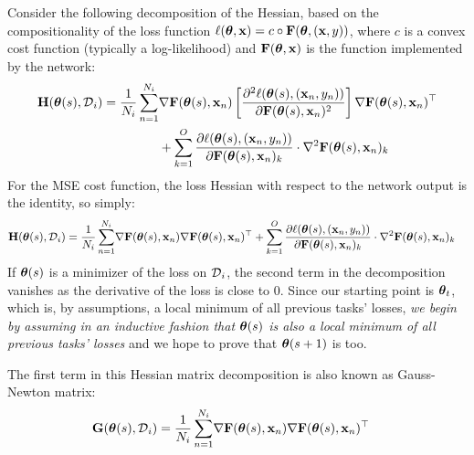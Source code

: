 \documentclass{article} %
\newcommand{\hessian}{\vH}
\begin{document}
Consider the following decomposition of the Hessian, based on the compositionality of the loss function $\ell(\mbox{$\mbox{$\boldsymbol{\theta}$}$}, \mbox{$\mbox{$\mathbf{x}$}$}) = c\circ\mbox{$\mbox{$\mathbf{F}$}$}(\mbox{$\mbox{$\boldsymbol{\theta}$}$},(\mbox{$\mbox{$\mathbf{x}$}$}, y))$, where $c$ is a convex cost function (typically a log-likelihood) and $\mbox{$\mbox{$\mathbf{F}$}$}(\mbox{$\mbox{$\boldsymbol{\theta}$}$},\mbox{$\mbox{$\mathbf{x}$}$})$ is the function implemented by the network: 
\begin{align}
    \label{eq:Hessian-decomposition}
    \hessian(\vparam(s), \data_{i}) 
    = \frac{1}{N_i} \sum_{n=1}^{N_i} & \grad{\vF(\vparam(s),\vx_n) \left[\frac{\partial^2\loss(\vparam(s), (\vx_n, y_n))}{\partial\vF(\vparam(s), \vx_n)^2}\right]\grad\vF(\vparam(s),\vx_n)^\top } \\
    & + \sum_{k=1}^O \frac{\partial \loss(\vparam(s), (\vx_n, y_n))}{\partial \vF(\vparam(s), \vx_n)_k} \cdot \grad^2\vF(\vparam(s), \vx_n)_k
\end{align}
For the MSE cost function, the loss Hessian with respect to the network output is the identity, so simply: 
\begin{align}
    \label{eq:Hessian-decomposition-2}
    \hessian(\vparam(s), \data_{i}) 
    = \frac{1}{N_i} \sum_{n=1}^{N_i} &\grad{\vF(\vparam(s), \vx_n)\grad\vF(\vparam(s), \vx_n)^\top } + \sum_{k=1}^O \frac{\partial \loss(\vparam(s), (\vx_n, y_n))}{\partial \vF(\vparam(s), \vx_n)_k} \cdot \grad^2\vF(\vparam(s), \vx_n)_k
\end{align}
If $\mbox{$\mbox{$\boldsymbol{\theta}$}$}(s)$ is a minimizer of the loss on $\mbox{${\cal D}$}_i$, the second term in the decomposition vanishes as the derivative of the loss is close to $0$. Since our starting point is $\mbox{$\mbox{$\boldsymbol{\theta}$}$}_t$, which is, by assumptions, a local minimum of all previous tasks' losses, \emph{we begin by assuming in an inductive fashion that $\mbox{$\mbox{$\boldsymbol{\theta}$}$}(s)$ is also a local minimum of all previous tasks' losses} and we hope to prove that $\mbox{$\mbox{$\boldsymbol{\theta}$}$}(s+1)$ is too.  

The first term in this Hessian matrix decomposition is also known as Gauss-Newton matrix:
\begin{align}
    \label{eq:GNM}
    \mbox{$\mbox{$\mathbf{G}$}$}(\mbox{$\mbox{$\boldsymbol{\theta}$}$}(s), \mbox{${\cal D}$}_{i}) 
    = \frac{1}{N_i} \sum_{n=1}^{N_i} &\nabla{\mbox{$\mbox{$\mathbf{F}$}$}(\mbox{$\mbox{$\boldsymbol{\theta}$}$}(s), \mbox{$\mbox{$\mathbf{x}$}$}_n)\nabla\mbox{$\mbox{$\mathbf{F}$}$}(\mbox{$\mbox{$\boldsymbol{\theta}$}$}(s), \mbox{$\mbox{$\mathbf{x}$}$}_n)^\top } 
\end{align}
\end{document}
